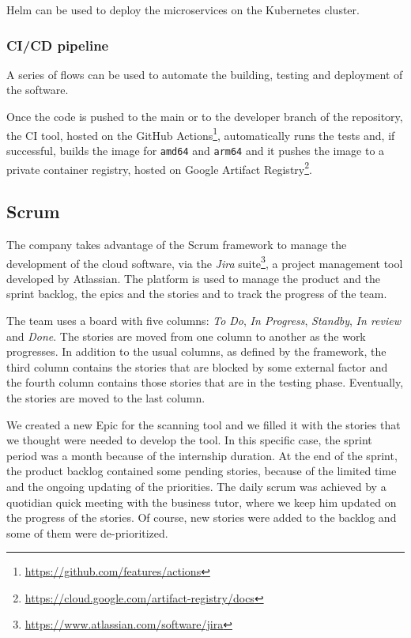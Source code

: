 Helm can be used to deploy the microservices on the Kubernetes cluster.

\subsubsection{CI/CD pipeline}

A series of flows can be used to automate the building, testing and deployment of the software.

Once the code is pushed to the main or to the developer branch of the repository, the CI tool, hosted on the GitHub Actions\footnote{\url{https://github.com/features/actions}}, automatically runs the tests and, if successful, builds the image for \texttt{amd64} and \texttt{arm64} and it pushes the image to a private container registry, hosted on Google Artifact Registry\footnote{\url{https://cloud.google.com/artifact-registry/docs}}.

\subsection{Scrum}

The company takes advantage of the Scrum framework to manage the development of the cloud software, via the \textit{Jira} suite\footnote{\url{https://www.atlassian.com/software/jira}}, a project management tool developed by Atlassian. The platform is used to manage the product and the sprint backlog, the epics and the stories and to track the progress of the team.

The team uses a board with five columns: \textit{To Do}, \textit{In Progress}, \textit{Standby}, \textit{In review} and \textit{Done}. The stories are moved from one column to another as the work progresses. In addition to the usual columns, as defined by the framework, the third column contains the stories that are blocked by some external factor and the fourth column contains those stories that are in the testing phase. Eventually, the stories are moved to the last column.

We created a new Epic for the scanning tool and we filled it with the stories that we thought were needed to develop the tool. In this specific case, the sprint period was a month because of the internship duration. At the end of the sprint, the product backlog contained some pending stories, because of the limited time and the ongoing updating of the priorities. The daily scrum was achieved by a quotidian quick meeting with the business tutor, where we keep him updated on the progress of the stories. Of course, new stories were added to the backlog and some of them were de-prioritized.


